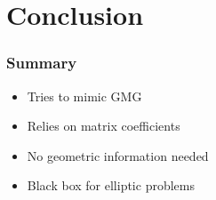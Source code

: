 \documentclass{beamer}
\newcommand{\re}[1]{{\textcolor{red}       {#1}}}
\renewcommand{\div}{\nabla\cdot\,}
\begin{document}
\section{Conclusion}
\begin{frame}
\frametitle{Summary}


\begin{itemize}
  \item Tries to mimic GMG

  \vspace{.15in}

  \item Relies on matrix coefficients

  \vspace{.15in}

  \item No geometric information needed

  \vspace{.15in}

  \item Black box for elliptic problems
\end{itemize}

\end{frame}







\nocite{*}


{\footnotesize
}
\end{document}

